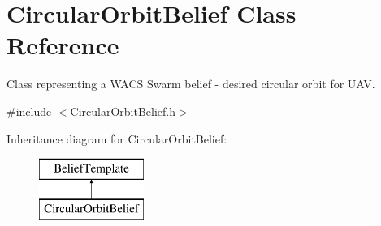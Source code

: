 \hypertarget{class_circular_orbit_belief}{
\section{CircularOrbitBelief Class Reference}
\label{class_circular_orbit_belief}
}


Class representing a WACS Swarm belief -\/ desired circular orbit for UAV.  




{\ttfamily \#include $<$CircularOrbitBelief.h$>$}

Inheritance diagram for CircularOrbitBelief:\begin{figure}[H]
\begin{center}
\leavevmode
\includegraphics[height=2.000000cm]{class_circular_orbit_belief}
\end{center}
\end{figure}
